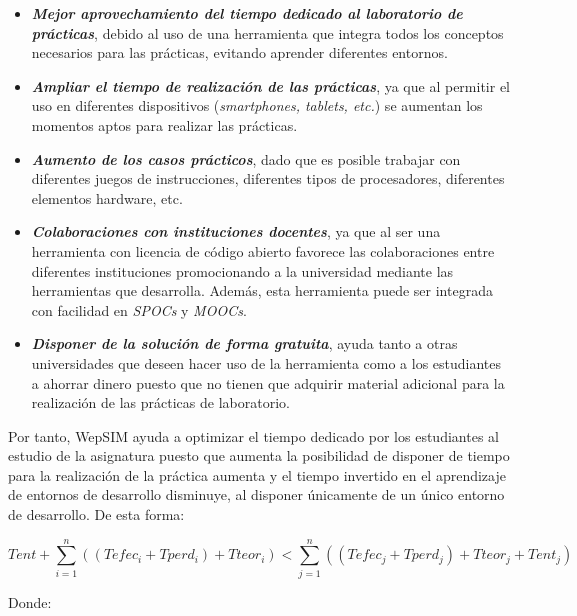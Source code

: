 \begin{itemize}

\item \textbf{\textit{Mejor aprovechamiento del tiempo dedicado al laboratorio de prácticas}}, debido al uso de una herramienta que integra todos los conceptos necesarios para las prácticas, evitando aprender diferentes entornos.

\item \textbf{\textit{Ampliar el tiempo de realización de las prácticas}}, ya que al permitir el uso en diferentes dispositivos (\emph{smartphones, tablets, etc.}) se aumentan los momentos aptos para realizar las prácticas.

\item \textbf{\textit{Aumento de los casos prácticos}}, dado que es posible trabajar con diferentes juegos de instrucciones, diferentes tipos de procesadores, diferentes elementos hardware, etc.

\item \textbf{\textit{Colaboraciones con instituciones docentes}}, ya que al ser una herramienta con licencia de código abierto favorece las colaboraciones entre diferentes instituciones promocionando a la universidad mediante las herramientas que desarrolla. Además, esta herramienta puede ser integrada con facilidad en \emph{SPOCs} y \emph{MOOCs}.

\item \textbf{\textit{Disponer de la solución de forma gratuita}}, ayuda tanto a otras universidades que deseen hacer uso de la herramienta como a los estudiantes a ahorrar dinero puesto que no tienen que adquirir material adicional para la realización de las prácticas de laboratorio.

\end{itemize}

Por tanto, WepSIM ayuda a optimizar el tiempo dedicado por los estudiantes al estudio de la asignatura puesto que aumenta la posibilidad de disponer de tiempo para la realización de la práctica aumenta y el tiempo invertido en el aprendizaje de entornos de desarrollo disminuye, al disponer únicamente de un único entorno de desarrollo. De esta forma:

\begin{equation}
 Tent + \sum_{i=1}^{n}((Tefec_{i} + Tperd_{i}) + Tteor_{i}) < \sum_{j=1}^{n}((Tefec_{j} + Tperd_{j}) + Tteor_{j}+ Tent_{j})
\label{eq:tiempo_invertido}
\end{equation}

Donde:

